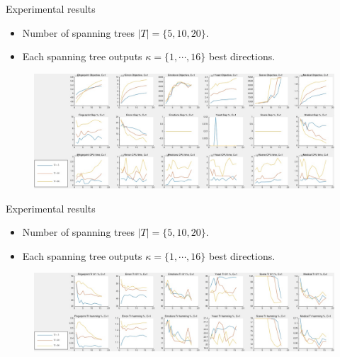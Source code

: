 \documentclass[first=dgreen,second=purple,logo=yellowexc]{aaltoslides}
\begin{document}
\begin{frame}{Experimental results}
	\begin{itemize}\footnotesize
		\item Number of spanning trees $|T|=\{5,10,20\}$.
		\item Each spanning tree outputs $\kappa=\{1,\cdots,16\}$ best directions.
	\end{itemize}
	\begin{figure}
		\begin{center}
			\includegraphics[scale=0.22]{./slide_overall_objective.jpg}
		\end{center}
	\end{figure}
\end{frame}

\begin{frame}{Experimental results}
	\begin{itemize}\footnotesize
		\item Number of spanning trees $|T|=\{5,10,20\}$.
		\item Each spanning tree outputs $\kappa=\{1,\cdots,16\}$ best directions.
	\end{itemize}
	\begin{figure}
		\begin{center}
			\includegraphics[scale=0.22]{./slide_overall_training.jpg}
		\end{center}
	\end{figure}
\end{frame}
\end{document}
